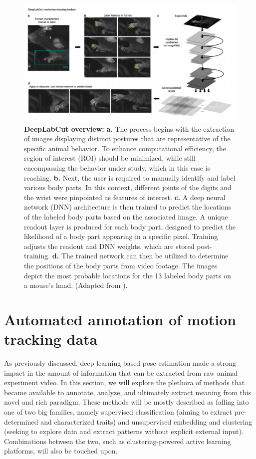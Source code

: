 \begin{figure}[!thb]
\centering
\includegraphics[width=\textwidth]{Figures/intro_4.pdf}

\caption[\textbf{DeepLabCut overview:} novel algorithms for markerless motion tracking]{\textbf{DeepLabCut overview:} \textbf{a.} The process begins with the extraction of images displaying distinct postures that are representative of the specific animal behavior. To enhance computational efficiency, the region of interest (ROI) should be minimized, while still encompassing the behavior under study, which in this case is reaching. \textbf{b.} Next, the user is required to manually identify and label various body parts. In this context, different joints of the digits and the wrist were pinpointed as features of interest. \textbf{c.} A deep neural network (DNN) architecture is then trained to predict the locations of the labeled body parts based on the associated image. A unique readout layer is produced for each body part, designed to predict the likelihood of a body part appearing in a specific pixel. Training adjusts the readout and DNN weights, which are stored post-training. \textbf{d.} The trained network can then be utilized to determine the positions of the body parts from video footage. The images depict the most probable locations for the 13 labeled body parts on a mouse's hand. (Adapted from \cite{Mathis2018DeepLabCut:Learning}).}
\label{fig:1.4}

\end{figure}

\section{Automated annotation of motion tracking data}

As previously discussed, deep learning based pose estimation made a strong impact in the amount of information that can be extracted from raw animal experiment video. In this section, we will explore the plethora of methods that became available to annotate, analyze, and ultimately extract meaning from this novel and rich paradigm. These methods will be mostly described as falling into one of two big families, namely supervised classification (aiming to extract pre-determined and characterized traits) and unsupervised embedding and clustering (seeking to explore data and extract patterns without explicit external input). Combinations between the two, such as clustering-powered active learning platforms, will also be touched upon.

